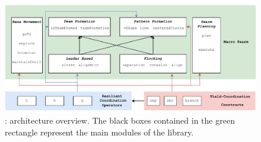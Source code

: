 

\begin{figure}[t]
  \includegraphics[width=\textwidth]{papers/coordination2023-macro/images/architecture.drawio.pdf}
  \caption[\MacroSwarm{}: architecture overview.]{\MacroSwarm{}: architecture overview. 
  The black boxes contained in the green rectangle 
  represent the main modules of the library.
  }\label{coordination2023-macro:fig:architecture}
\end{figure}


